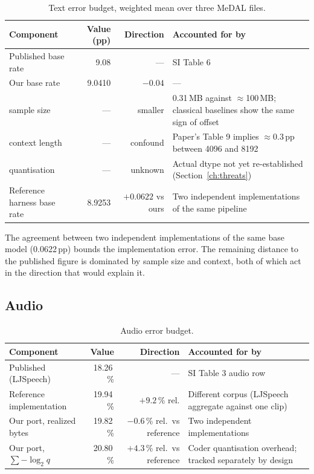 \documentclass[11pt,a4paper]{article}
\begin{document}
\begin{table}[htbp]
\centering
\small
\caption{Text error budget, weighted mean over three MeDAL files.}
\label{tab:textbudget}
\begin{tabularx}{\textwidth}{L{4.2cm}rrX}
\toprule
Component & Value (pp) & Direction & Accounted for by \\
\midrule
Published base rate & 9.08 & --- & SI Table 6 \\
Our base rate & 9.0410 & $-0.04$ & --- \\
\quad sample size & --- & smaller & 0.31\,MB against $\approx$100\,MB; classical
  baselines show the same sign of offset \\
\quad context length & --- & confound & Paper's Table 9 implies $\approx0.3$\,pp
  between 4096 and 8192 \\
\quad quantisation & --- & unknown & Actual dtype not yet re-established
  (Section~\ref{ch:threats}) \\
\midrule
Reference harness base rate & 8.9253 & $+0.0622$ vs ours & Two independent
  implementations of the same pipeline \\
\bottomrule
\end{tabularx}
\end{table}

The agreement between two independent implementations of the same base model
(\num{0.0622}\,pp) bounds the implementation error. The remaining distance to the
published figure is dominated by sample size and context, both of which act in
the direction that would explain it.

\subsection{Audio}

\begin{table}[htbp]
\centering
\small
\caption{Audio error budget.}
\label{tab:audiobudget}
\begin{tabularx}{\textwidth}{L{4.2cm}rrX}
\toprule
Component & Value & Direction & Accounted for by \\
\midrule
Published (LJSpeech) & 18.26\,\% & --- & SI Table 3 audio row \\
Reference implementation & 19.94\,\% & $+9.2$\,\% rel. & Different corpus
  (LJSpeech aggregate against one clip) \\
Our port, realized bytes & 19.82\,\% & $-0.6$\,\% rel.\ vs reference & Two
  independent implementations \\
Our port, $\sum-\log_2 q$ & 20.80\,\% & $+4.3$\,\% rel.\ vs reference & Coder
  quantisation overhead; tracked separately by design \\
\bottomrule
\end{tabularx}
\end{table}
\end{document}
